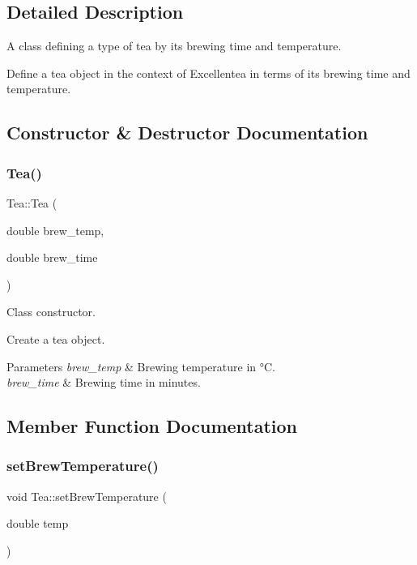 \subsection{Detailed Description}
A class defining a type of tea by its brewing time and temperature. 

Define a tea object in the context of Excellentea in terms of its brewing time and temperature. 

\subsection{Constructor \& Destructor Documentation}
\mbox{\label{classTea_a0788a36a50457565433259205e916f04}} 
\subsubsection{\texorpdfstring{Tea()}{Tea()}}
{\footnotesize\ttfamily Tea\+::\+Tea (\begin{DoxyParamCaption}\item[{double}]{brew\+\_\+temp,  }\item[{double}]{brew\+\_\+time }\end{DoxyParamCaption})}



Class constructor. 

Create a tea object. 
\begin{DoxyParams}{Parameters}
{\em brew\+\_\+temp} & Brewing temperature in °C. \\
\hline
{\em brew\+\_\+time} & Brewing time in minutes. \\
\hline
\end{DoxyParams}


\subsection{Member Function Documentation}
\mbox{\label{classTea_acb5bec6356db757e2deb5598b6a7ad37}} 
\subsubsection{\texorpdfstring{set\+Brew\+Temperature()}{setBrewTemperature()}}
{\footnotesize\ttfamily void Tea\+::set\+Brew\+Temperature (\begin{DoxyParamCaption}\item[{double}]{temp }\end{DoxyParamCaption})}




